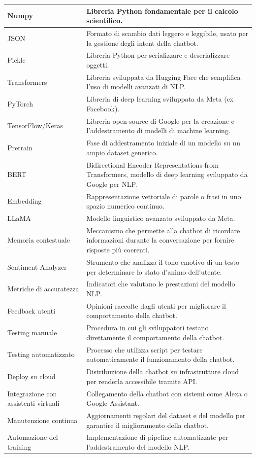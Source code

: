 \documentclass[12pt, letterpaper]{article}
\begin{document}
\begin{longtable}{|l|p{10cm}|}
	\hline
	Numpy & Libreria Python fondamentale per il calcolo scientifico. \\
	\hline
	JSON & Formato di scambio dati leggero e leggibile, usato per la gestione degli intent della chatbot. \\
	\hline
	Pickle & Libreria Python per serializzare e deserializzare oggetti. \\
	\hline
	Transformers & Libreria sviluppata da Hugging Face che semplifica l'uso di modelli avanzati di NLP. \\
	\hline
	PyTorch & Libreria di deep learning sviluppata da Meta (ex Facebook). \\
	\hline
	TensorFlow/Keras & Libreria open-source di Google per la creazione e l’addestramento di modelli di machine learning. \\
	\hline
	Pretrain & Fase di addestramento iniziale di un modello su un ampio dataset generico. \\
	\hline
	BERT & Bidirectional Encoder Representations from Transformers, modello di deep learning sviluppato da Google per NLP. \\
	\hline
	Embedding & Rappresentazione vettoriale di parole o frasi in uno spazio numerico continuo. \\
	\hline
	LLaMA & Modello linguistico avanzato sviluppato da Meta. \\
	\hline
	Memoria contestuale & Meccanismo che permette alla chatbot di ricordare informazioni durante la conversazione per fornire risposte più coerenti. \\
	\hline
	Sentiment Analyzer & Strumento che analizza il tono emotivo di un testo per determinare lo stato d’animo dell’utente. \\
	\hline
	Metriche di accuratezza & Indicatori che valutano le prestazioni del modello NLP. \\
	\hline
	Feedback utenti & Opinioni raccolte dagli utenti per migliorare il comportamento della chatbot. \\
	\hline
	Testing manuale & Procedura in cui gli sviluppatori testano direttamente il comportamento della chatbot. \\
	\hline
	Testing automatizzato & Processo che utilizza script per testare automaticamente il funzionamento della chatbot. \\
	\hline
	Deploy su cloud & Distribuzione della chatbot su infrastrutture cloud per renderla accessibile tramite API. \\
	\hline
	Integrazione con assistenti virtuali & Collegamento della chatbot con sistemi come Alexa o Google Assistant. \\
	\hline
	Manutenzione continua & Aggiornamenti regolari del dataset e del modello per garantire il miglioramento della chatbot. \\
	\hline
	Automazione del training & Implementazione di pipeline automatizzate per l’addestramento del modello NLP. \\
	\hline
\end{longtable}
\end{document}
